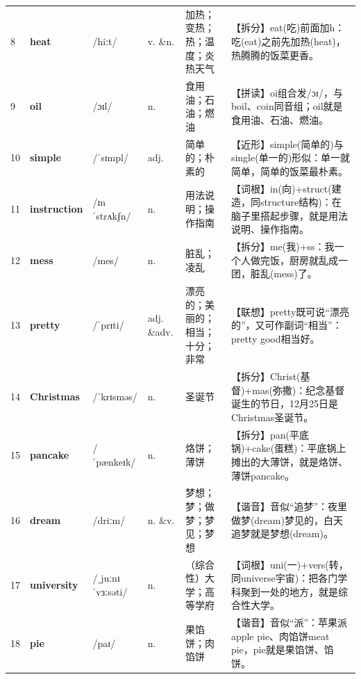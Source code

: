 \documentclass[UTF8,a4paper,11pt,oneside]{ctexbook}
\newcommand{\cellword}[1]{{\bfseries\textcolor{wordcol}{#1}}}
\newcommand{\cellipa}[1]{{\footnotesize\textcolor{ipacol}{#1}}}
\newcommand{\cellpos}[1]{\textcolor{poscol}{#1}}
\newcommand{\cellno}[1]{\textcolor{volcolor!75!black}{#1}}
\begin{document}
{\begin{longtable}{@{}C{0.045\textwidth}L{0.155\textwidth}L{0.175\textwidth}C{0.070\textwidth}L{0.180\textwidth}L{0.282\textwidth}@{}}
\cellno{8} & \cellword{heat} & \cellipa{/hiːt/} & \cellpos{v. \&n.} & 加热；变热；热；温度；炎热天气 & \textcolor{tagSplit}{【拆分】}eat(吃)前面加h：吃(eat)之前先加热(heat)，热腾腾的饭菜更香。 \\
 \cellno{9} & \cellword{oil} & \cellipa{/ɔɪl/} & \cellpos{n.} & 食用油；石油；燃油 & \textcolor{tagSpell}{【拼读】}oi组合发/ɔɪ/，与boil、coin同音组；oil就是食用油、石油、燃油。 \\
\cellno{10} & \cellword{simple} & \cellipa{/ˈsɪmpl/} & \cellpos{adj.} & 简单的；朴素的 & \textcolor{tagNear}{【近形】}simple(简单的)与single(单一的)形似：单一就简单，简单的饭菜最朴素。 \\
 \cellno{11} & \cellword{instruction} & \cellipa{/ɪnˈstrʌkʃn/} & \cellpos{n.} & 用法说明；操作指南 & \textcolor{tagRoot}{【词根】}in(向)+struct(建造，同structure结构)：在脑子里搭起步骤，就是用法说明、操作指南。 \\
\cellno{12} & \cellword{mess} & \cellipa{/mes/} & \cellpos{n.} & 脏乱；凌乱 & \textcolor{tagSplit}{【拆分】}me(我)+ss：我一个人做完饭，厨房就乱成一团，脏乱(mess)了。 \\
 \cellno{13} & \cellword{pretty} & \cellipa{/ˈprɪti/} & \cellpos{adj. \&adv.} & 漂亮的；美丽的；相当；十分；非常 & \textcolor{tagAssoc}{【联想】}pretty既可说“漂亮的”，又可作副词“相当”：pretty good相当好。 \\
\cellno{14} & \cellword{Christmas} & \cellipa{/ˈkrɪsməs/} & \cellpos{n.} & 圣诞节 & \textcolor{tagSplit}{【拆分】}Christ(基督)+mas(弥撒)：纪念基督诞生的节日，12月25日是Christmas圣诞节。 \\
 \cellno{15} & \cellword{pancake} & \cellipa{/ˈpænkeɪk/} & \cellpos{n.} & 烙饼；薄饼 & \textcolor{tagSplit}{【拆分】}pan(平底锅)+cake(蛋糕)：平底锅上摊出的大薄饼，就是烙饼、薄饼pancake。 \\
\cellno{16} & \cellword{dream} & \cellipa{/driːm/} & \cellpos{n. \&v.} & 梦想；梦；做梦；梦见；梦想 & \textcolor{tagSound}{【谐音】}音似“追梦”：夜里做梦(dream)梦见的，白天追梦就是梦想(dream)。 \\
 \cellno{17} & \cellword{university} & \cellipa{/ˌjuːnɪˈvɜːsəti/} & \cellpos{n.} & （综合性）大学；高等学府 & \textcolor{tagRoot}{【词根】}uni(一)+vers(转，同universe宇宙)：把各门学科聚到一处的地方，就是综合性大学。 \\
\cellno{18} & \cellword{pie} & \cellipa{/paɪ/} & \cellpos{n.} & 果馅饼；肉馅饼 & \textcolor{tagSound}{【谐音】}音似“派”：苹果派apple pie、肉馅饼meat pie，pie就是果馅饼、馅饼。 \\

\end{longtable}}
\end{document}
